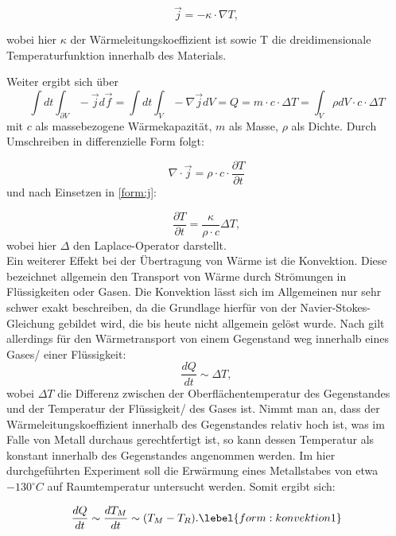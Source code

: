 \begin{equation}
\vec{j} = - \kappa \cdot \nabla T, 
\label{form:j}
\end{equation}

wobei hier $ \kappa $ der Wärmeleitungskoeffizient ist sowie T die dreidimensionale Temperaturfunktion innerhalb des Materials. 

Weiter ergibt sich über
\begin{equation}
\int dt \int_{\partial V} -\vec{j} d \vec{f} = \int dt \int_{V} -\nabla \vec{j} dV = Q = m \cdot c \cdot \Delta T = \int_{V} \rho dV \cdot c \cdot \Delta T
\end{equation}
mit $c$ als massebezogene Wärmekapazität, $m$ als Masse, $\rho$ als Dichte. Durch Umschreiben in differenzielle Form folgt: 

\begin{equation}
\nabla \cdot \vec{j} = \rho \cdot c \cdot  \frac{\partial T}{\partial t}
\end{equation} 
und nach Einsetzen in \ref{form:j}: 

\begin{equation}
\frac{\partial T}{\partial t} = \frac{\kappa}{\rho \cdot c} \Delta T, 
\end{equation}
wobei hier $\Delta$ den Laplace-Operator darstellt. 
\\
Ein weiterer Effekt bei der Übertragung von Wärme ist die Konvektion. Diese bezeichnet allgemein den Transport von Wärme durch Strömungen in Flüssigkeiten oder Gasen. Die Konvektion lässt sich im Allgemeinen nur sehr schwer exakt beschreiben, da die Grundlage hierfür von der Navier-Stokes-Gleichung gebildet wird, die bis heute nicht allgemein gelöst wurde. Nach \cite{praktikumwaerme} gilt allerdings für den Wärmetransport von einem Gegenstand weg innerhalb eines Gases/ einer Flüssigkeit: 
\begin{equation}
\frac{dQ}{dt} \sim \Delta T,
\end{equation}
wobei $\Delta T$ die Differenz zwischen der Oberflächentemperatur des Gegenstandes und der Temperatur der Flüssigkeit/ des Gases ist. 
Nimmt man an, dass der Wärmeleitungskoeffizient innerhalb des Gegenstandes relativ hoch ist, was im Falle von Metall durchaus gerechtfertigt ist, so kann dessen Temperatur als konstant innerhalb des Gegenstandes angenommen werden. 
Im hier durchgeführten Experiment soll die Erwärmung eines Metallstabes von etwa $ -130 ^{\circ} C $ auf Raumtemperatur untersucht werden. Somit ergibt sich: 

\begin{equation}
\frac{dQ}{dt} \sim  \frac{dT_M}{dt} \sim (T_{M} - T_{R}). 
\lebel{form:konvektion1}
\end{equation}

